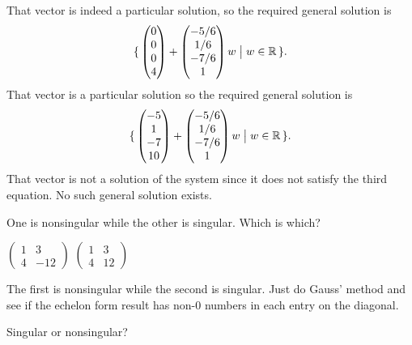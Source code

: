 \begin{exercises}
\begin{answer}
      \begin{exparts}
        \partsitem That vector is indeed a particular solution, so the required
          general solution is
          \begin{equation*}
            \mbox{$\{\,\begin{pmatrix} 0 \\ 0 \\ 0 \\ 4 \end{pmatrix}+
                 \begin{pmatrix} -5/6 \\ 1/6 \\ -7/6 \\ 1 \end{pmatrix}w\bigm| w\in\mathbb{R}\,\}$}.
          \end{equation*}
        \partsitem That vector is a particular solution so the required
          general solution is
          \begin{equation*}
            \mbox{$\{\,\begin{pmatrix} -5 \\ 1 \\ -7 \\ 10 \end{pmatrix}+
                 \begin{pmatrix} -5/6 \\ 1/6 \\ -7/6 \\ 1 \end{pmatrix}w\bigm| w\in\mathbb{R}\,\}$}.
          \end{equation*}
        \partsitem That vector is not a solution of the system since
          it does not satisfy the third equation.
          No such general solution exists.
      \end{exparts} 
    \end{answer}
  \item 
     One is nonsingular while the other is singular.
     Which is which?
     \begin{exparts*}
       \partsitem $\begin{pmatrix}
           1  &3   \\
           4  &-12    
         \end{pmatrix}$
       \partsitem $\begin{pmatrix}
           1  &3  \\
           4  &12  
         \end{pmatrix}$
     \end{exparts*}
     \begin{answer}
       The first is nonsingular while the second is singular.
       Just do Gauss' method and see if the echelon form result has
       non-$0$ numbers in each entry on the diagonal.
     \end{answer}
  \recommended \item 
    Singular or nonsingular?

\end{exercises}
